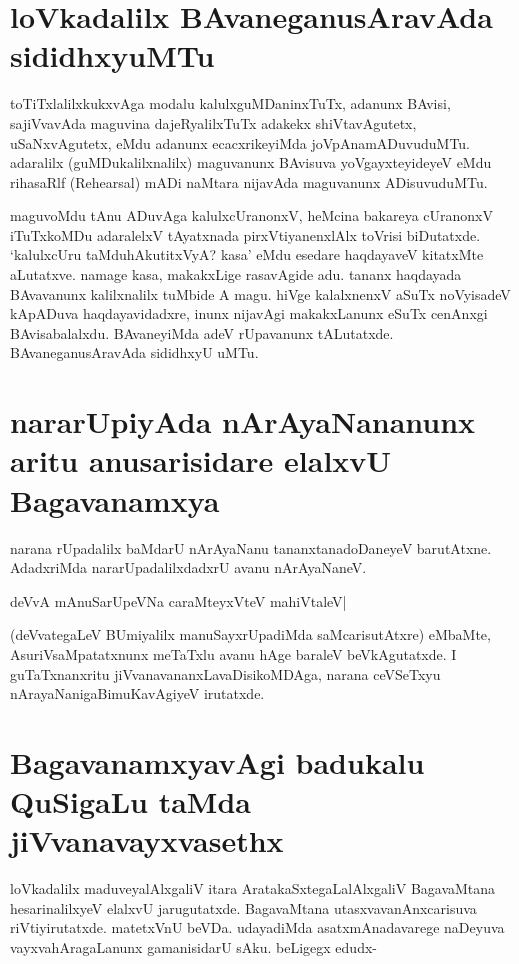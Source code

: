 \section*{loVkadalilx BAvaneganusAravAda sididhxyuMTu}

toTiTxlalilxkukxvAga modalu kalulxguMDaninxTuTx, adanunx BAvisi, sajiVvavAda maguvina dajeRyalilxTuTx adakekx shiVtavAgutetx, uSaNxvAgutetx, eMdu adanunx ecacxrikeyiMda joVpAnamADuvuduMTu. adaralilx (guMDukalilxnalilx) maguvanunx BAvisuva yoVgayxteyideyeV eMdu rihasaRlf ({\eng Rehearsal}) mADi naMtara nijavAda maguvanunx ADisuvuduMTu. 

maguvoMdu tAnu ADuvAga kalulxcUranonxV, heMcina bakareya cUranonxV iTuTxkoMDu adaralelxV tAyatxnada pirxVtiyanenxlAlx toVrisi biDutatxde. `kalulxcUru taMduhAkutitxVyA? kasa' eMdu esedare haqdayaveV kitatxMte aLutatxve. namage kasa, makakxLige rasavAgide adu. tananx haqdayada BAvavanunx kalilxnalilx tuMbide A magu. hiVge kalalxnenxV aSuTx noVyisadeV kApADuva haqdayavidadxre, inunx nijavAgi makakxLanunx eSuTx cenAnxgi BAvisabalalxdu. BAvaneyiMda adeV rUpavanunx tALutatxde. BAvaneganusAravAda sididhxyU uMTu. 

\section*{nararUpiyAda nArAyaNananunx aritu anusarisidare elalxvU Bagavanamxya} 

narana rUpadalilx baMdarU nArAyaNanu tananxtanadoDaneyeV barutAtxne. AdadxriMda nararUpadalilxdadxrU avanu nArAyaNaneV. 

\begin{shloka}
deVvA mAnuSarUpeVNa caraMteyxVteV mahiVtaleV|\label{146b}
\end{shloka} 

(deVvategaLeV BUmiyalilx manuSayxrUpadiMda saMcarisutAtxre) eMbaMte, AsuriVsaMpatatxnunx meTaTxlu avanu hAge baraleV beVkAgutatxde. I guTaTxnanxritu jiVvanavananxLavaDisikoMDAga, narana ceVSeTxyu nArayaNanigaBimuKavAgiyeV irutatxde. 

\section*{BagavanamxyavAgi badukalu QuSigaLu taMda jiVvanavayxvasethx}

loVkadalilx maduveyalAlxgaliV itara AratakaSxtegaLalAlxgaliV BagavaMtana hesarinalilxyeV elalxvU jarugutatxde. BagavaMtana utasxvavanAnxcarisuva riVtiyirutatxde. matetxVnU beVDa. udayadiMda asatxmAnadavarege naDeyuva vayxvahAragaLanunx gamanisidarU sAku. beLigegx edudx- 

